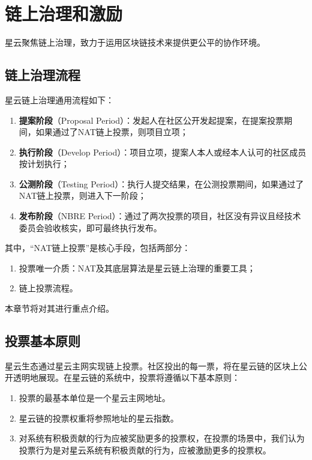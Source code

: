 \section{链上治理和激励}

星云聚焦链上治理，致力于运用区块链技术来提供更公平的协作环境。

\subsection{链上治理流程}
\label{governance}

星云链上治理通用流程如下：

\begin{enumerate}
	\item \textbf{提案阶段}（Proposal Period）：发起人在社区公开发起提案，在提案投票期间，如果通过了NAT链上投票，则项目立项；
	\item \textbf{执行阶段}（Develop Period）：项目立项，提案人本人或经本人认可的社区成员按计划执行；
	\item \textbf{公测阶段}（Testing Period）：执行人提交结果，在公测投票期间，如果通过了NAT链上投票，则进入下一阶段；
	\item \textbf{发布阶段}（NBRE Period）：通过了两次投票的项目，社区没有异议且经技术委员会验收核实，即可最终执行发布。
\end{enumerate}

其中，“NAT链上投票”是核心手段，包括两部分：

\begin{enumerate}
	\item 投票唯一介质：NAT及其底层算法是星云链上治理的重要工具；
	\item 链上投票流程。
\end{enumerate}

本章节将对其进行重点介绍。

\subsection{投票基本原则}

星云生态通过星云主网实现链上投票。社区投出的每一票，将在星云链的区块上公开透明地展现。在星云链的系统中，投票将遵循以下基本原则：

\begin{enumerate}
	\item 投票的最基本单位是一个星云主网地址。
	\item 星云链的投票权重将参照地址的星云指数。
	\item 对系统有积极贡献的行为应被奖励更多的投票权，在投票的场景中，我们认为投票行为是对星云系统有积极贡献的行为，应被激励更多的投票权。
\end{enumerate}

